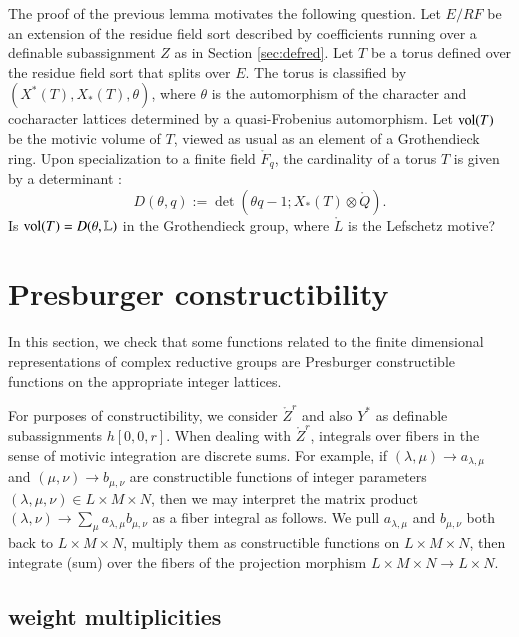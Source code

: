 \begin{remark} The proof of the previous lemma motivates the following
  question.  Let $E/RF$ be an extension of the residue field sort
  described by coefficients running over a definable subassignment
  $Z$ as in Section \ref{sec:defred}.  Let $T$ be a torus defined over
  the residue field sort that splits over $E$.  The torus is
  classified by $(X^*(T),X_*(T),\theta)$, where $\theta$ is the
  automorphism of the character and cocharacter lattices determined by
  a quasi-Frobenius automorphism.  Let ${\operatorname{vol}}(T)$ be the motivic
  volume of $T$, viewed as usual as an element of a Grothendieck ring.
  Upon specialization to a finite field $\ring{F}_q$, the cardinality of a torus $T$ is
  given by a determinant \cite[Prop.3.3.7]{carter1985finite}:
\[
D(\theta,q):=\det(\theta q-1; X_*(T)\otimes\ring{Q}).
\]
Is ${\operatorname{vol}}(T) = D(\theta,\mathbb{L})$ in the
Grothendieck group, where $\ring{L}$ is the Lefschetz motive?
\end{remark}


\section{Presburger constructibility}

In this section, we check that some functions related to the finite
dimensional representations of complex reductive groups are Presburger
constructible functions on the appropriate integer lattices.  

\begin{remark}\label{rem:matrix}
  For purposes of constructibility, we consider $\ring{Z}^r$ and also
  $Y^*$ as definable subassignments $h[0,0,r]$. When dealing with
  $\ring{Z}^r$, integrals over fibers in the sense of motivic
  integration are discrete sums.  For example, if $(\lambda,\mu)\to
  a_{\lambda,\mu}$ and $(\mu,\nu)\to b_{\mu,\nu}$ are constructible
  functions of integer parameters $(\lambda,\mu,\nu)\in L\times
  M\times N$, then we may interpret the matrix product
  $(\lambda,\nu)\to \sum_{\mu} a_{\lambda,\mu} b_{\mu,\nu}$ as a fiber
  integral as follows.  We pull $a_{\lambda,\mu}$ and $b_{\mu,\nu}$
  both back to $L\times M\times N$, multiply them as constructible
  functions on $L\times M\times N$, then integrate (sum) over the
  fibers of the projection morphism $L\times M\times N\to L\times N$.
\end{remark}


\subsection{weight multiplicities}


